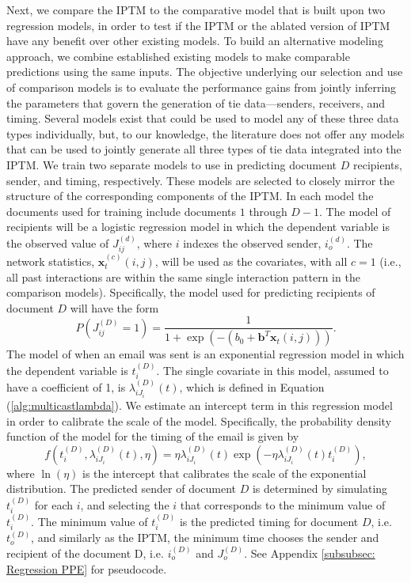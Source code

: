 \documentclass[a4paper]{article}
\begin{document}
Next, we compare the IPTM to the comparative model that is built upon two regression models, in order to test if the IPTM or the ablated version of IPTM have any benefit over other existing models. To build an alternative modeling approach, we combine established existing models to make comparable predictions using the same inputs. The objective underlying our selection and use of comparison models is to evaluate the performance gains from jointly inferring the parameters that govern the generation of tie data---senders, receivers, and timing. Several models exist that could be used to model any of these three data types individually, but, to our knowledge, the literature does not offer any models that can be used to jointly generate all three types of tie data integrated into the IPTM. We train two separate models to use in predicting document $D$ recipients, sender, and timing, respectively. These models are selected to closely mirror the structure of the corresponding components of the IPTM. In each model the documents used for training include documents $1$ through $D-1$. The model of recipients will be a logistic regression model in which the dependent variable is the observed value of $J^{(d)}_{ij}$, where $i$ indexes the observed sender, $i_o^{(d)}$. The network statistics, $\boldsymbol{x}^{(c)}_t(i, j)$, will be used as the covariates, with all $c=1$ (i.e., all past interactions are within the same single interaction pattern in the comparison models). Specifically, the model used for predicting recipients of document $D$ will have the form 
\begin{equation}
P(J^{(D)}_{ij}=1)=\frac{1}{1+\exp\left(-(b_0 +\boldsymbol{b}^T\boldsymbol{x}_t(i, j))\right)}.
\label{eqn:predrec}
\end{equation}
The model of when an email was sent is an exponential regression model in which the dependent variable is $t_i^{(D)}$. The single covariate in this model, assumed to have a coefficient of 1, is $\lambda_{iJ_i}^{(D)}(t)$, which is defined in Equation (\ref{alg:multicastlambda}). We estimate an intercept term in this regression model in order to calibrate the scale of the model. Specifically, the probability density function of the model for the timing of the email is given by
\begin{equation}
f(t_i^{(D)},\lambda_{iJ_i}^{(D)}(t),\eta) = \eta\lambda_{iJ_i}^{(D)}(t)\exp(- \eta\lambda_{iJ_i}^{(D)}(t)t_i^{(D)}),
\label{eqn:predtime}
\end{equation}
where $\ln(\eta)$ is the intercept that calibrates the scale of the exponential distribution. The predicted sender of document $D$ is determined by simulating $t_i^{(D)}$ for each $i$, and selecting the $i$ that corresponds to the minimum value of $t_i^{(D)}$. The minimum value of $t_i^{(D)}$ is the predicted timing for document $D$, i.e. $t_o^{(D)}$, and similarly as the IPTM, the minimum time chooses the sender and recipient of the document D, i.e. $i_o^{(D)}$ and $J_o^{(D)}$. See Appendix \ref{subsubsec: Regression PPE} for pseudocode.
\end{document}
